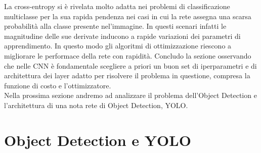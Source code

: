 \documentclass[12pt,a4paper,openright,twoside]{report}
\begin{document}
La cross-entropy si è rivelata molto adatta nei problemi di classificazione multiclasse per la sua rapida pendenza nei casi in cui la rete assegna una scarsa probabilità alla classe presente nel'immagine. In questi scenari infatti le magnitudine delle sue derivate inducono a rapide variazioni dei parametri di apprendimento. In questo modo gli algoritmi di ottimizzazione riescono a migliorare le performace della rete con rapidità.
\newpage
Concludo la sezione osservando che nelle CNN è fondamentale scegliere a priori un buon set di iperparametri e di architettura dei layer adatto per risolvere il problema in questione, compresa la funzione di costo e l'ottimizzatore. \\

Nella prossima sezione andremo ad analizzare il problema dell'Object Detection e l'architettura di una nota rete di Object Detection, YOLO.
\newpage
\section{Object Detection e YOLO}
\end{document}
